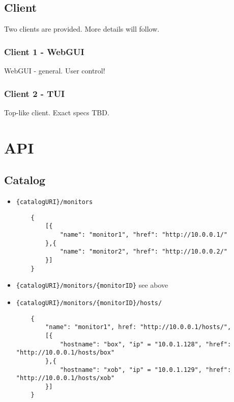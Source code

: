 \documentclass[a4paper]{article}
\begin{document}
\subsection{Client}
Two clients are provided. More details will follow.
\subsubsection{Client 1 - WebGUI}
	WebGUI - general. User control!
\subsubsection{Client 2 - TUI}
	Top-like client. Exact specs TBD.
\clearpage
\section{API}
\subsection{Catalog}
\begin{itemize}
	\item \texttt{\{catalogURI\}/monitors}
	\begin{verbatim}
	{
		[{
			"name": "monitor1", "href": "http://10.0.0.1/"
		},{
			"name": "monitor2", "href": "http://10.0.0.2/"
		}]
	}
	\end{verbatim}
	\item \texttt{\{catalogURI\}/monitors/\{monitorID\}}
	see above
	\item \texttt{\{catalogURI\}/monitors/\{monitorID\}/hosts/}
	\begin{verbatim}
	{
		"name": "monitor1", href: "http://10.0.0.1/hosts/",
		[{
			"hostname": "box", "ip" = "10.0.1.128", "href": "http://10.0.0.1/hosts/box"
		},{
			"hostname": "xob", "ip" = "10.0.1.129", "href": "http://10.0.0.1/hosts/xob"
		}]
	}
	\end{verbatim}
\end{itemize}
\end{document}
